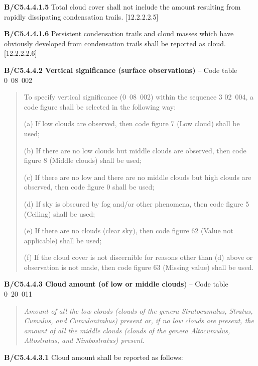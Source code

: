 \textbf{B/C5.4.4.1.5} Total cloud cover shall not include the amount resulting from rapidly dissipating condensation trails. {[}12.2.2.2.5{]}

\textbf{B/C5.4.4.1.6} Persistent condensation trails and cloud masses which have obviously developed from condensation trails shall be reported as cloud. {[}12.2.2.2.6{]}

\textbf{B/C5.4.4.2 Vertical significance (surface observations)} -- Code table 0~08~002

\begin{quote}
To specify vertical significance (0~08~002) within the sequence 3 02~004, a code figure shall be selected in the following way:

(a) If low clouds are observed, then code figure 7 (Low cloud) shall be used;

(b) If there are no low clouds but middle clouds are observed, then code figure 8 (Middle clouds) shall be used;

(c) If there are no low and there are no middle clouds but high clouds are observed, then code figure 0 shall be used;

(d) If sky is obscured by fog and/or other phenomena, then code figure 5 (Ceiling) shall be used;

(e) If there are no clouds (clear sky), then code figure 62 (Value not applicable) shall be used;

(f) If the cloud cover is not discernible for reasons other than (d) above or observation is not made, then code figure 63 (Missing value) shall be used.
\end{quote}

\textbf{B/C5.4.4.3 Cloud amount (of low or middle clouds}) -- Code table 0~20~011

\begin{quote}
\emph{Amount of all the low clouds (clouds of the genera Stratocumulus, Stratus, Cumulus, and Cumulonimbus) present or, if no low clouds are present, the amount of all the middle clouds (clouds of the genera Altocumulus, Altostratus, and Nimbostratus) present}.
\end{quote}

\textbf{B/C5.4.4.3.1} Cloud amount shall be reported as follows:

